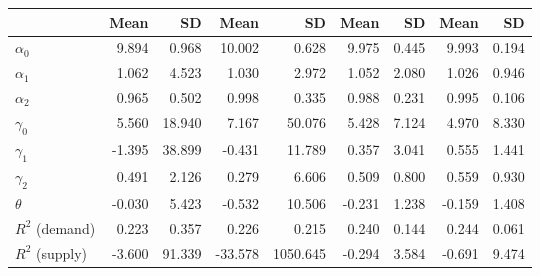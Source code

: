 
\begin{tabular}[t]{lrrrrrrrr}
\toprule
  & Mean & SD & Mean  & SD  & Mean   & SD   & Mean    & SD   \\
\midrule
$\alpha_{0}$ & 9.894 & 0.968 & 10.002 & 0.628 & 9.975 & 0.445 & 9.993 & 0.194\\
$\alpha_{1}$ & 1.062 & 4.523 & 1.030 & 2.972 & 1.052 & 2.080 & 1.026 & 0.946\\
$\alpha_{2}$ & 0.965 & 0.502 & 0.998 & 0.335 & 0.988 & 0.231 & 0.995 & 0.106\\
$\gamma_{0}$ & 5.560 & 18.940 & 7.167 & 50.076 & 5.428 & 7.124 & 4.970 & 8.330\\
$\gamma_{1}$ & -1.395 & 38.899 & -0.431 & 11.789 & 0.357 & 3.041 & 0.555 & 1.441\\
$\gamma_{2}$ & 0.491 & 2.126 & 0.279 & 6.606 & 0.509 & 0.800 & 0.559 & 0.930\\
$\theta$ & -0.030 & 5.423 & -0.532 & 10.506 & -0.231 & 1.238 & -0.159 & 1.408\\
$R^{2}$ (demand) & 0.223 & 0.357 & 0.226 & 0.215 & 0.240 & 0.144 & 0.244 & 0.061\\
$R^{2}$ (supply) & -3.600 & 91.339 & -33.578 & 1050.645 & -0.294 & 3.584 & -0.691 & 9.474\\
\bottomrule
\end{tabular}
